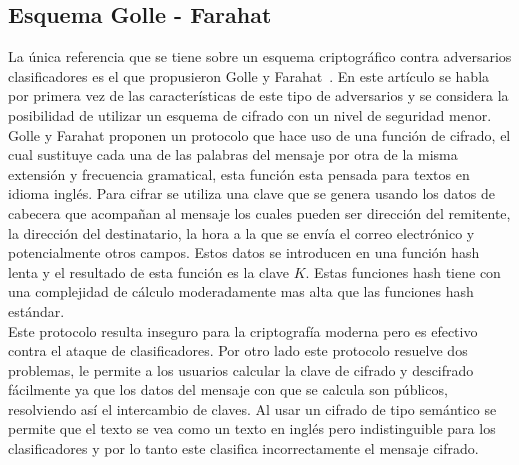 \subsection{Esquema Golle - Farahat}
La  única  referencia  que se tiene  sobre  un  esquema  criptográfico  contra  adversarios clasificadores es el que propusieron Golle y Farahat~\cite{Attacks}. En este art\'iculo se habla por primera vez de las caracter\'isticas de este tipo de adversarios  y se considera la posibilidad de utilizar un esquema de cifrado con un nivel de seguridad menor.
Golle y Farahat proponen un protocolo que hace uso de una función  de cifrado, el cual sustituye cada una de las palabras del mensaje por otra de la misma extensión y frecuencia gramatical, esta función esta pensada para textos en idioma ingl\'es. 
Para cifrar se utiliza una clave que se genera  usando los datos de cabecera que acompañan al mensaje los cuales pueden ser dirección  del remitente, la dirección del destinatario, la hora a la que se envía el correo electrónico y potencialmente otros campos. Estos datos se introducen en una función hash lenta y el resultado de esta función es la clave $K$. Estas funciones hash  tiene con una complejidad de c\'alculo moderadamente mas alta que las 
funciones hash est\'andar.  \\
Este  protocolo resulta inseguro para la criptografía moderna pero es efectivo contra el ataque de clasificadores. Por otro lado este protocolo resuelve dos problemas, le  permite  a los usuarios  calcular  la  clave de cifrado y descifrado  fácilmente  ya  que  los datos del mensaje con que se calcula son  públicos, resolviendo así el intercambio de claves. Al usar un cifrado de tipo semántico se permite que el texto se vea como un texto en inglés pero indistinguible para los clasificadores y por lo tanto este clasifica incorrectamente el mensaje cifrado.\\

